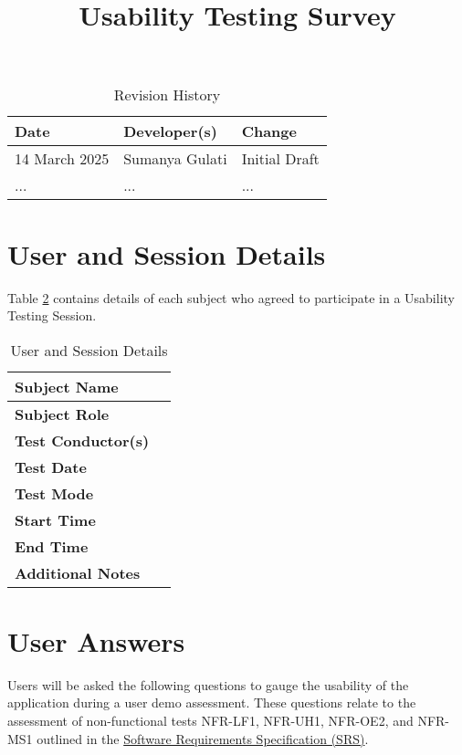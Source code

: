 \documentclass{article}
\title{Usability Testing Survey\\\progname}
\author{\authname}
\date{}
\begin{document}
\maketitle

\begin{table}[hp]
\caption{Revision History} \label{TblRevisionHistory}
\begin{tabularx}{\textwidth}{llX}
\toprule
\textbf{Date} & \textbf{Developer(s)} & \textbf{Change}\\
\midrule
14 March 2025 & Sumanya Gulati & Initial Draft\\
... & ... & ...\\
\bottomrule
\end{tabularx}
\end{table}

\newpage

\section{User and Session Details}
Table \ref{UserDetails} contains details of each subject who agreed to participate in a 
Usability Testing Session.
\begin{table}[hp]
\begin{tabularx}{\textwidth}{l | X}
\toprule
\textbf{Subject Name} &  \\
\midrule
\textbf{Subject Role} &  \\
\midrule
\textbf{Test Conductor(s)} &  \\
\midrule
\textbf{Test Date} &  \\
\midrule
\textbf{Test Mode} &  \\
\midrule
\textbf{Start Time} &  \\
\midrule
\textbf{End Time} &  \\
\midrule
\textbf{Additional Notes} &  \\
\bottomrule
\end{tabularx}
\caption{User and Session Details} \label{UserDetails}
\end{table}

\section{User Answers}

Users will be asked the following questions to gauge the usability of the
application during a user demo assessment. These questions relate to
the assessment of non-functional tests NFR-LF1, NFR-UH1, NFR-OE2, and NFR-MS1 outlined in the 
\href{https://github.com/SumanyaG/Alkalytics/blob/main/docs/SRS/SRS.pdf}{Software Requirements Specification (SRS)}.
\end{document}
